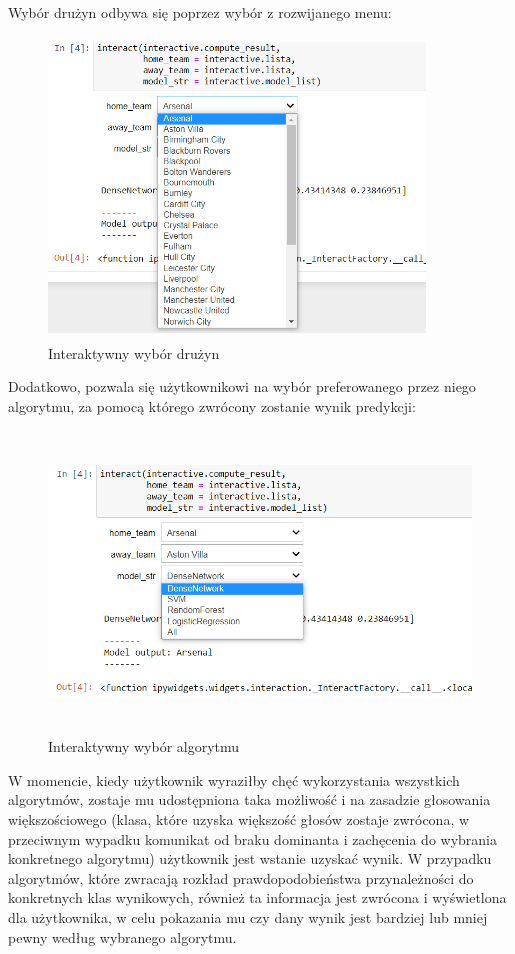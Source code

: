 Wybór drużyn odbywa się poprzez wybór z rozwijanego menu:
\begin{figure}[H] 
        \centering\includegraphics[width=10cm,height=8cm]{figures/Interactive_team_selection.png}
        \caption{Interaktywny wybór drużyn}\label{interactive_tem}
\end{figure}
Dodatkowo, pozwala się użytkownikowi na wybór preferowanego przez niego algorytmu, za pomocą którego zwrócony zostanie wynik predykcji:
\begin{figure}[H] 
        \centering\includegraphics[width=12cm,height=8cm]{figures/Interactive_alg_selection.png}
        \caption{Interaktywny wybór algorytmu}\label{interactive_alg}
\end{figure}
W momencie, kiedy użytkownik wyraziłby chęć wykorzystania wszystkich algorytmów, zostaje mu udostępniona taka możliwość i na zasadzie głosowania większościowego (klasa, które uzyska większość głosów zostaje zwrócona, w przeciwnym wypadku komunikat od braku dominanta i zachęcenia do wybrania konkretnego algorytmu) użytkownik jest wstanie uzyskać wynik. W przypadku algorytmów, które zwracają rozkład prawdopodobieństwa przynależności do konkretnych klas wynikowych, również ta informacja jest zwrócona i wyświetlona dla użytkownika, w celu pokazania mu czy dany wynik jest bardziej lub mniej pewny według wybranego algorytmu. 


